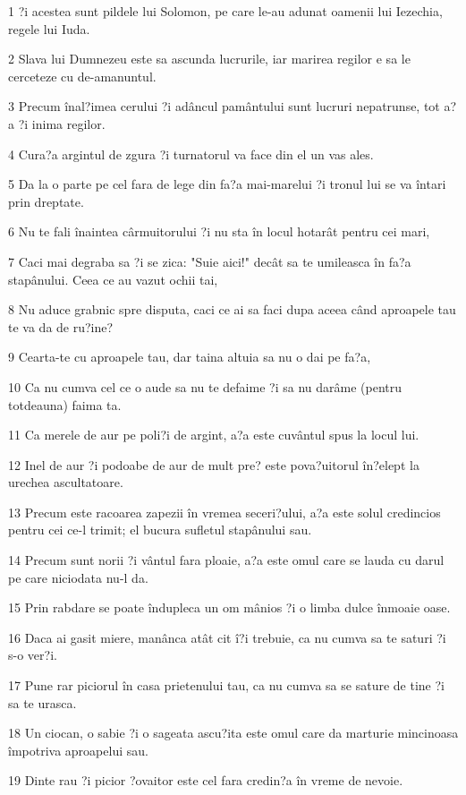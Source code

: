 \par 1 ?i acestea sunt pildele lui Solomon, pe care le-au adunat oamenii lui Iezechia, regele lui Iuda.
\par 2 Slava lui Dumnezeu este sa ascunda lucrurile, iar marirea regilor e sa le cerceteze cu de-amanuntul.
\par 3 Precum înal?imea cerului ?i adâncul pamântului sunt lucruri nepatrunse, tot a?a ?i inima regilor.
\par 4 Cura?a argintul de zgura ?i turnatorul va face din el un vas ales.
\par 5 Da la o parte pe cel fara de lege din fa?a mai-marelui ?i tronul lui se va întari prin dreptate.
\par 6 Nu te fali înaintea cârmuitorului ?i nu sta în locul hotarât pentru cei mari,
\par 7 Caci mai degraba sa ?i se zica: "Suie aici!" decât sa te umileasca în fa?a stapânului. Ceea ce au vazut ochii tai,
\par 8 Nu aduce grabnic spre disputa, caci ce ai sa faci dupa aceea când aproapele tau te va da de ru?ine?
\par 9 Cearta-te cu aproapele tau, dar taina altuia sa nu o dai pe fa?a,
\par 10 Ca nu cumva cel ce o aude sa nu te defaime ?i sa nu darâme (pentru totdeauna) faima ta.
\par 11 Ca merele de aur pe poli?i de argint, a?a este cuvântul spus la locul lui.
\par 12 Inel de aur ?i podoabe de aur de mult pre? este pova?uitorul în?elept la urechea ascultatoare.
\par 13 Precum este racoarea zapezii în vremea seceri?ului, a?a este solul credincios pentru cei ce-l trimit; el bucura sufletul stapânului sau.
\par 14 Precum sunt norii ?i vântul fara ploaie, a?a este omul care se lauda cu darul pe care niciodata nu-l da.
\par 15 Prin rabdare se poate îndupleca un om mânios ?i o limba dulce înmoaie oase.
\par 16 Daca ai gasit miere, manânca atât cit î?i trebuie, ca nu cumva sa te saturi ?i s-o ver?i.
\par 17 Pune rar piciorul în casa prietenului tau, ca nu cumva sa se sature de tine ?i sa te urasca.
\par 18 Un ciocan, o sabie ?i o sageata ascu?ita este omul care da marturie mincinoasa împotriva aproapelui sau.
\par 19 Dinte rau ?i picior ?ovaitor este cel fara credin?a în vreme de nevoie.
